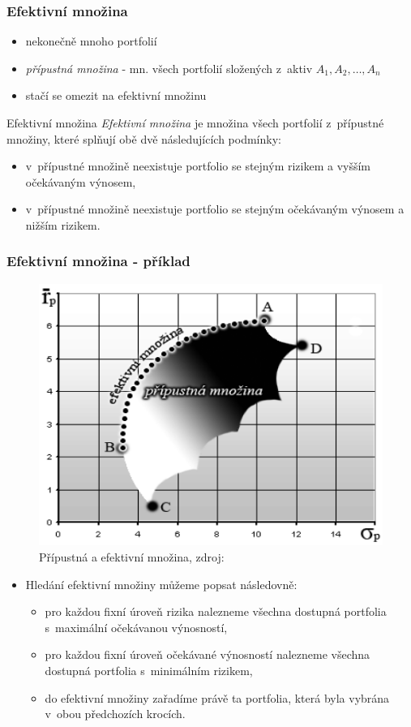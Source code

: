 \begin{frame}
    \frametitle{Efektivní množina}
    \begin{itemize}
      \item nekonečně mnoho portfolií
      \item \emph{přípustná množina} -  mn. všech portfolií složených z~aktiv $A_1,A_2,\dots,A_n$
      \item stačí se omezit na efektivní množinu
       \end{itemize}
       \begin{block}{Efektivní množina}
       \emph{Efektivní množina} je množina všech portfolií z~přípustné množiny, které splňují obě dvě následujících podmínky:
\begin{itemize}
\item v~přípustné množině neexistuje portfolio se stejným rizikem a vyšším očekávaným výnosem,
\item v~přípustné množině neexistuje portfolio se stejným očekávaným výnosem a nižším rizikem. 
\end{itemize}
       \end{block}
\end{frame}


\begin{frame}
    \frametitle{Efektivní množina - příklad}
    \begin{figure}[htb]
\centering
\includegraphics[width=.6\textwidth]{ef_mn.png}
\caption{Přípustná a efektivní množina, zdroj: \cite{camsky} \label{ef_mn}}
\end{figure}
  \end{frame}
  
  \begin{frame}
  \begin{itemize}
  \frametitle{Hledání efektivní množiny}
 \item Hledání efektivní množiny můžeme popsat následovně:
\begin{itemize}
\item pro každou fixní úroveň rizika nalezneme všechna dostupná portfolia s~maximální očekávanou výnosností, 
\item pro každou fixní úroveň očekávané výnosností nalezneme všechna dostupná portfolia s~minimálním rizikem,
\item do efektivní množiny zařadíme právě ta portfolia, která byla vybrána v~obou předchozích krocích.
\end{itemize}
\end{itemize}
  \end{frame}
  
